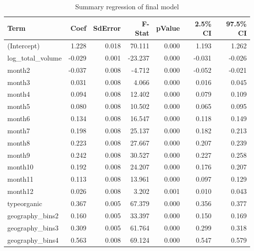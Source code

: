 \documentclass[11pt]{article}\usepackage[]{graphicx}\usepackage[]{color}
\begin{document}
\begin{center}
\begin{table}[ht]
\centering
\begin{tabular}{lrrrrrr}
  \hline
Term & Coef & SdError & F-Stat & pValue & 2.5\% CI & 97.5\% CI \\ 
  \hline
(Intercept) & 1.228 & 0.018 & 70.111 & 0.000 & 1.193 & 1.262 \\ 
  log\_total\_volume & -0.029 & 0.001 & -23.237 & 0.000 & -0.031 & -0.026 \\ 
  month2 & -0.037 & 0.008 & -4.712 & 0.000 & -0.052 & -0.021 \\ 
  month3 & 0.031 & 0.008 & 4.066 & 0.000 & 0.016 & 0.045 \\ 
  month4 & 0.094 & 0.008 & 12.402 & 0.000 & 0.079 & 0.109 \\ 
  month5 & 0.080 & 0.008 & 10.502 & 0.000 & 0.065 & 0.095 \\ 
  month6 & 0.134 & 0.008 & 16.547 & 0.000 & 0.118 & 0.149 \\ 
  month7 & 0.198 & 0.008 & 25.137 & 0.000 & 0.182 & 0.213 \\ 
  month8 & 0.223 & 0.008 & 27.667 & 0.000 & 0.207 & 0.239 \\ 
  month9 & 0.242 & 0.008 & 30.527 & 0.000 & 0.227 & 0.258 \\ 
  month10 & 0.192 & 0.008 & 24.207 & 0.000 & 0.176 & 0.207 \\ 
  month11 & 0.113 & 0.008 & 13.961 & 0.000 & 0.097 & 0.129 \\ 
  month12 & 0.026 & 0.008 & 3.202 & 0.001 & 0.010 & 0.043 \\ 
  typeorganic & 0.367 & 0.005 & 67.379 & 0.000 & 0.356 & 0.377 \\ 
  geography\_bins2 & 0.160 & 0.005 & 33.397 & 0.000 & 0.150 & 0.169 \\ 
  geography\_bins3 & 0.309 & 0.005 & 61.764 & 0.000 & 0.299 & 0.318 \\ 
  geography\_bins4 & 0.563 & 0.008 & 69.124 & 0.000 & 0.547 & 0.579 \\ 
   \hline
\end{tabular}
\caption{Summary regression of final model} 
\label{final_fit}
\end{table}

\end{center}
\end{document}
